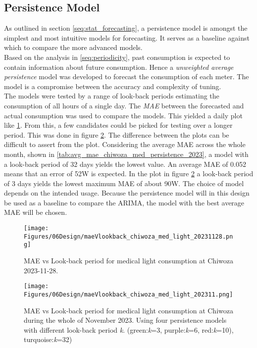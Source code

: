 \subsection{Persistence Model}
As outlined in section \ref{seq:stat_forecasting}, a persistence model is amongst the simplest and most intuitive models for forecasting. It serves as a baseline against which to compare the more advanced models.\\

Based on the analysis in \ref{seq:periodicity}, past consumption is expected to contain information about future consumption. Hence a \textit{unweighted average persistence} model was developed to forecast the consumption of each meter. The model is a compromise between the accuracy and complexity of tuning.\\

The models were tested by a range of look-back periods estimating the consumption of all hours of a single day. The \textit{MAE} between the forecasted and actual consumption was used to compare the models. This yielded a daily plot like \ref{fig:maeVlookback_chiwoza_med_light_20231128}. From this, a few candidates could be picked for testing over a longer period. This was done in figure \ref{fig:maeVlookback_chiwoza_med_light202311}. The difference between the plots can be difficult to assert from the plot. Considering the average MAE across the whole month, shown in \ref{tab:avg_mae_chiwoza_med_persistence_2023}, a model with a look-back period of 32 days yields the lowest value. An average MAE of 0.052 means that an error of 52W is expected. In the plot in figure \ref{fig:maeVlookback_chiwoza_med_light202311} a look-back period of 3 days yields the lowest maximum MAE of about 90W. The choice of model depends on the intended usage. Because the persistence model will in this design be used as a baseline to compare the ARIMA, the model with the best average MAE will be chosen.  

\begin{figure}
    \centering
    \texttt{[image: Figures/06Design/maeVlookback\_chiwoza\_med\_light\_20231128.png]}
    \caption[MAE vs lookback-period Medical Light Chiwoza 20231128]{MAE vs Look-back period for medical light consumption at Chiwoza 2023-11-28.}
    \label{fig:maeVlookback_chiwoza_med_light_20231128}
\end{figure}

\begin{figure}
    \centering
    \texttt{[image: Figures/06Design/maeVlookback\_chiwoza\_med\_light\_202311.png]}
    \caption[MAE vs look-back Medical light 202311]{MAE vs Look-back period for medical light consumption at Chiwoza during the whole of November 2023. Using four persistence models with different look-back period \textit{k}. (green:\textit{k}=3, purple:\textit{k}=6, red:\textit{k}=10), turquoise:\textit{k}=32)}
    \label{fig:maeVlookback_chiwoza_med_light202311}
\end{figure}

